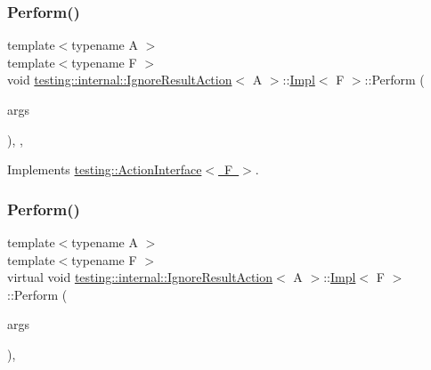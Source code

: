 \subsubsection{\texorpdfstring{Perform()}{Perform()}\hspace{0.1cm}{\footnotesize\ttfamily [2/3]}}
{\footnotesize\ttfamily template$<$typename A $>$ \\
template$<$typename F $>$ \\
void \mbox{\hyperlink{classtesting_1_1internal_1_1_ignore_result_action}{testing\+::internal\+::\+Ignore\+Result\+Action}}$<$ A $>$\+::\mbox{\hyperlink{classtesting_1_1internal_1_1_ignore_result_action_1_1_impl}{Impl}}$<$ F $>$\+::Perform (\begin{DoxyParamCaption}\item[{const \mbox{\hyperlink{classtesting_1_1_action_interface_af72720d864da4d606629e83edc003511}{Argument\+Tuple}} \&}]{args }\end{DoxyParamCaption})\hspace{0.3cm}{\ttfamily [inline]}, {\ttfamily [override]}, {\ttfamily [virtual]}}



Implements \mbox{\hyperlink{classtesting_1_1_action_interface_a20f8624fcea1786f2992b358760422a0}{testing\+::\+Action\+Interface$<$ F $>$}}.

\mbox{\label{classtesting_1_1internal_1_1_ignore_result_action_1_1_impl_ad2b7d520f2d50cf640da1a039a81684f}} 
\subsubsection{\texorpdfstring{Perform()}{Perform()}\hspace{0.1cm}{\footnotesize\ttfamily [3/3]}}
{\footnotesize\ttfamily template$<$typename A $>$ \\
template$<$typename F $>$ \\
virtual void \mbox{\hyperlink{classtesting_1_1internal_1_1_ignore_result_action}{testing\+::internal\+::\+Ignore\+Result\+Action}}$<$ A $>$\+::\mbox{\hyperlink{classtesting_1_1internal_1_1_ignore_result_action_1_1_impl}{Impl}}$<$ F $>$\+::Perform (\begin{DoxyParamCaption}\item[{const \mbox{\hyperlink{classtesting_1_1_action_interface_af72720d864da4d606629e83edc003511}{Argument\+Tuple}} \&}]{args }\end{DoxyParamCaption})\hspace{0.3cm}{\ttfamily [inline]}, {\ttfamily [virtual]}}



